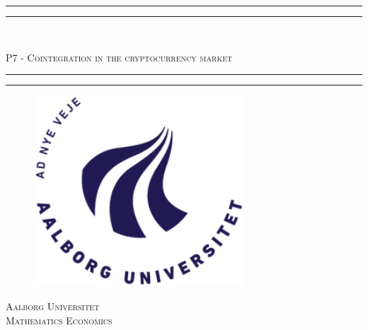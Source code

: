 \begin{flushright}


\phantom{hul}


\end{flushright}


\thispagestyle{empty} 
\noindent \rule{\textwidth}{1.6pt}\vspace*{-\baselineskip}\vspace*{2pt} %
\rule{\textwidth}{0.4pt}\
\begin{center} \LARGE \textsc{P7 - Cointegration in the cryptocurrency market} \\
\end{center}
\rule{\textwidth}{0.4pt}\vspace*{-\baselineskip}\vspace{3.2pt} %
\rule{\textwidth}{1.6pt} %
\vspace{2cm}

\begin{figure}[H]
\centering
\includegraphics[width=0.70\textwidth]{Formalities/Billeder/AAU_logo_2012.png}
\end{figure}

\vfill
\begin{center}
\textsc{Aalborg Universitet} \\
\textsc{Mathematics Economics} \\
\end{center}

\null
\pagebreak
